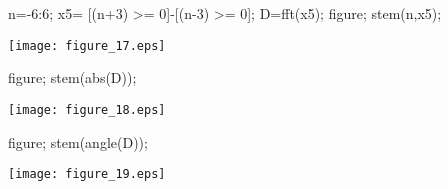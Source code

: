 \documentclass[12pt, onecolumn]{IEEEtran}
\begin{document}
\begin{matlabcode}
n=-6:6; %
x5= [(n+3) >= 0]-[(n-3) >= 0]; %
D=fft(x5);
figure; 
stem(n,x5);
\end{matlabcode}
\begin{center}
\texttt{[image: figure\_17.eps]}
\end{center}
\begin{matlabcode}
figure; 
stem(abs(D));
\end{matlabcode}
\begin{center}
\texttt{[image: figure\_18.eps]}
\end{center}
\begin{matlabcode}
figure; 
stem(angle(D));
\end{matlabcode}
\begin{center}
\texttt{[image: figure\_19.eps]}
\end{center}
\end{document}

